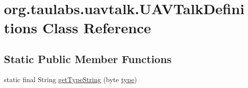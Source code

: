 \hypertarget{classorg_1_1taulabs_1_1uavtalk_1_1_u_a_v_talk_definitions}{\section{org.\-taulabs.\-uavtalk.\-U\-A\-V\-Talk\-Definitions Class Reference}
\label{classorg_1_1taulabs_1_1uavtalk_1_1_u_a_v_talk_definitions}
}
\subsection*{Static Public Member Functions}
\begin{DoxyCompactItemize}
\item 
static final String \hyperlink{classorg_1_1taulabs_1_1uavtalk_1_1_u_a_v_talk_definitions_a34571929ed6e8c37505c8434ee15508f}{get\-Type\-String} (byte \hyperlink{glext_8h_a7d05960f4f1c1b11f3177dc963a45d86}{type})
\end{DoxyCompactItemize}
